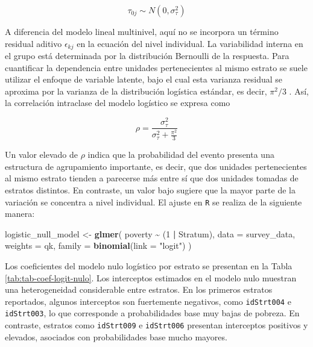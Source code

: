 \documentclass[
  spanish,
  12pt,
]{book}
\newenvironment{Shaded}{\begin{snugshade}}{\end{snugshade}}
\newcommand{\AttributeTok}[1]{\textcolor[rgb]{0.13,0.29,0.53}{#1}}
\newcommand{\DecValTok}[1]{\textcolor[rgb]{0.00,0.00,0.81}{#1}}
\newcommand{\FunctionTok}[1]{\textcolor[rgb]{0.13,0.29,0.53}{\textbf{#1}}}
\newcommand{\NormalTok}[1]{#1}
\newcommand{\OtherTok}[1]{\textcolor[rgb]{0.56,0.35,0.01}{#1}}
\newcommand{\SpecialCharTok}[1]{\textcolor[rgb]{0.81,0.36,0.00}{\textbf{#1}}}
\newcommand{\StringTok}[1]{\textcolor[rgb]{0.31,0.60,0.02}{#1}}
\begin{document}
\[
\tau_{0j} \sim N(0,\sigma_{\tau}^{2})
\]

A diferencia del modelo lineal multinivel, aquí no se incorpora un término residual aditivo \(\epsilon_{kj}\) en la ecuación del nivel individual. La variabilidad interna en el grupo está determinada por la distribución Bernoulli de la respuesta. Para cuantificar la dependencia entre unidades pertenecientes al mismo estrato se suele utilizar el enfoque de variable latente, bajo el cual esta varianza residual se aproxima por la varianza de la distribución logística estándar, es decir, \(\pi^2/3\) \citep{snijders2011}. Así, la correlación intraclase del modelo logístico se expresa como

\[
\rho =
\frac{\sigma_\tau^2}
{\sigma_\tau^2 + \frac{\pi^2}{3}}
\]

Un valor elevado de \(\rho\) indica que la probabilidad del evento presenta una estructura de agrupamiento importante, es decir, que dos unidades pertenecientes al mismo estrato tienden a parecerse más entre sí que dos unidades tomadas de estratos distintos. En contraste, un valor bajo sugiere que la mayor parte de la variación se concentra a nivel individual. El ajuste en \texttt{R} se realiza de la siguiente manera:

\begin{Shaded}
\begin{Highlighting}[]
\NormalTok{logistic\_null\_model }\OtherTok{\textless{}{-}} \FunctionTok{glmer}\NormalTok{(}
\NormalTok{  poverty }\SpecialCharTok{\textasciitilde{}}\NormalTok{ (}\DecValTok{1} \SpecialCharTok{|}\NormalTok{ Stratum),}
  \AttributeTok{data =}\NormalTok{ survey\_data,}
  \AttributeTok{weights =}\NormalTok{ qk,}
  \AttributeTok{family =} \FunctionTok{binomial}\NormalTok{(}\AttributeTok{link =} \StringTok{"logit"}\NormalTok{)}
\NormalTok{)}
\end{Highlighting}
\end{Shaded}

Los coeficientes del modelo nulo logístico por estrato se presentan en la Tabla \ref{tab:tab-coef-logit-nulo}. Los interceptos estimados en el modelo nulo muestran una heterogeneidad considerable entre estratos. En los primeros estratos reportados, algunos interceptos son fuertemente negativos, como \texttt{idStrt004} e \texttt{idStrt003}, lo que corresponde a probabilidades base muy bajas de pobreza. En contraste, estratos como \texttt{idStrt009} e \texttt{idStrt006} presentan interceptos positivos y elevados, asociados con probabilidades base mucho mayores.
\end{document}
